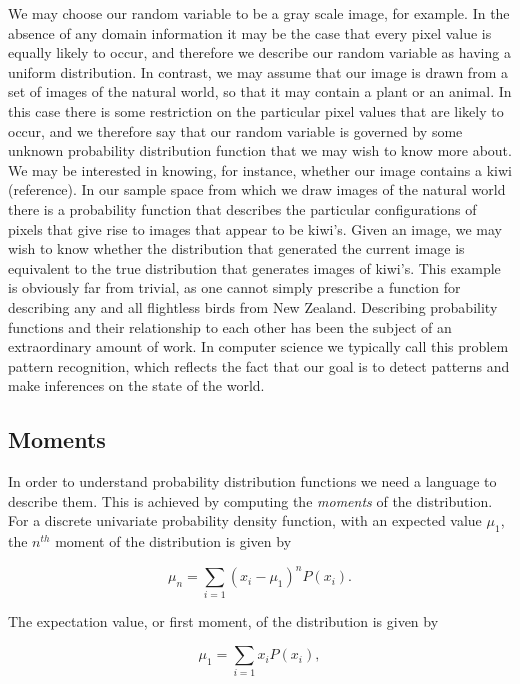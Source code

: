 We may choose our random variable to be a gray scale image, for example. In the absence of any domain information it may be the case that every pixel value is equally likely to occur, and therefore we describe our random variable as having a uniform distribution. In contrast, we may assume that our image is drawn from a set of images of the natural world, so that it may contain a plant or an animal. In this case there is some restriction on the particular pixel values that are likely to occur, and we therefore say that our random variable is governed by some unknown probability distribution function that we may wish to know more about. We may be interested in knowing, for instance, whether our image contains a kiwi (reference). In our sample space from which we draw images of the natural world there is a probability function that describes the particular configurations of pixels that give rise to images that appear to be kiwi's. Given an image, we may wish to know whether the distribution that generated the current image is equivalent to the true distribution that generates images of kiwi's. This example is obviously far from trivial, as one cannot simply prescribe a function for describing any and all flightless birds from New Zealand. Describing probability functions and their relationship to each other has been the subject of an extraordinary amount of work. In computer science we typically call this problem pattern recognition, which reflects the fact that our goal is to detect patterns and make inferences on the state of the world. 

\subsection{Moments}

In order to understand probability distribution functions we need a language to describe them. This is achieved by computing the \textit{moments} of the distribution. For a discrete univariate probability density function, with an expected value $\mu_1$, the $n^{th}$ moment of the distribution is given by

\begin{equation}
\mu_n = \sum_{i=1}{(x_i - \mu_1)^{n}P(x_i)}.
\end{equation}

\noindent The expectation value, or first moment, of the distribution is given by

\begin{equation}
\mu_1 = \sum_{i=1}{x_i P(x_i)},
\end{equation}


